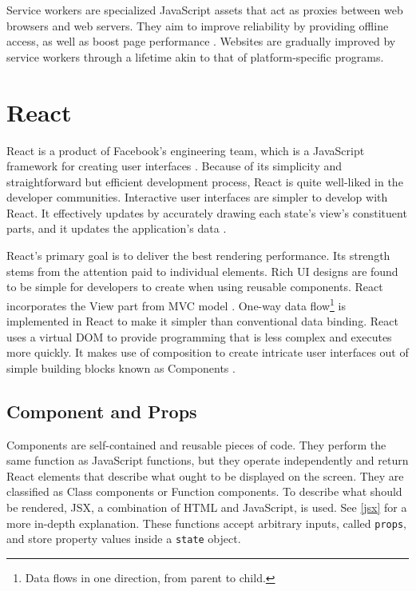 Service workers are specialized JavaScript assets that act as proxies between web browsers and web servers. They aim to improve reliability by providing offline access, as well as boost page performance \autocite{chrome2021service}. Websites are gradually improved by service workers through a lifetime akin to that of platform-specific programs.


\section{React}
\label{react}
React is a product of Facebook's engineering team, which is a JavaScript framework for creating user interfaces \autocite{gackenheimer2015introducing}. Because of its simplicity and straightforward but efficient development process, React is quite well-liked in the developer communities. Interactive user interfaces are simpler to develop with React. It effectively updates by accurately drawing each state's view's constituent parts, and it updates the application's data \autocite{islam2017reactjs}.

React's primary goal is to deliver the best rendering performance. Its strength stems from the attention paid to individual elements. Rich UI designs are found to be simple for developers to create when using reusable components. React incorporates the View part from MVC model \autocite{maratkar2021re}. One-way data flow\footnote{Data flows in one direction, from parent to child.} is implemented in React to make it simpler than conventional data binding. React uses a virtual DOM to provide programming that is less complex and executes more quickly. It makes use of composition to create intricate user interfaces out of simple building blocks known as Components \autocite{david2020building}.

\subsection{Component and Props}
Components are self-contained and reusable pieces of code. They perform the same function as JavaScript functions, but they operate independently and return React elements that describe what ought to be displayed on the screen. They are classified as Class components or Function components. To describe what should be rendered, JSX, a combination of HTML and JavaScript, is used. See \autoref{jsx} for a more in-depth explanation. These functions accept arbitrary inputs, called \texttt{props}, and store property values inside a \texttt{state} object.

